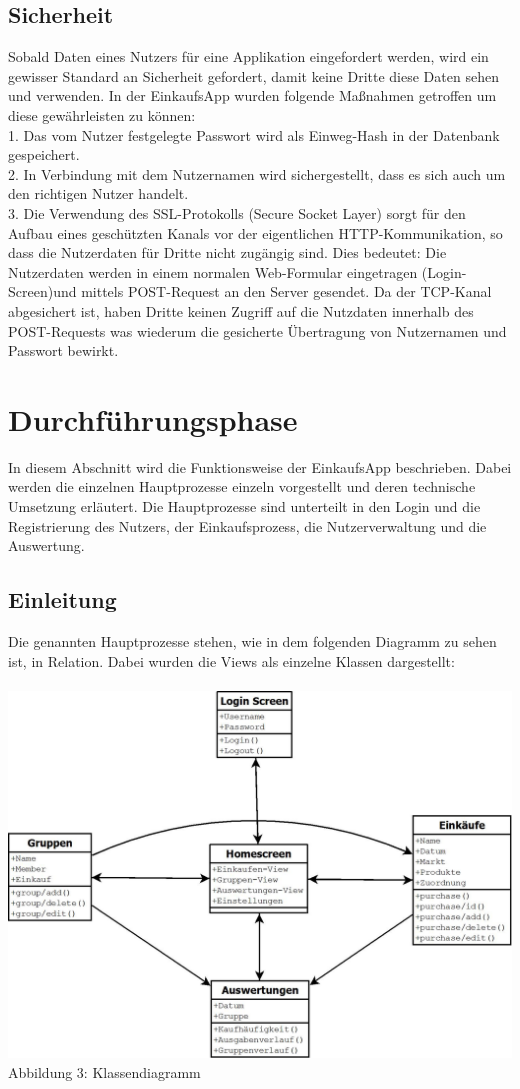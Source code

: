 \documentclass[12pt,a4paper]{article}
\begin{document}
\subsection{Sicherheit}
Sobald Daten eines Nutzers für eine Applikation eingefordert werden, wird ein gewisser Standard an Sicherheit gefordert, damit keine Dritte diese Daten sehen und verwenden.
In der EinkaufsApp wurden folgende Maßnahmen getroffen um diese gewährleisten zu können:
\\
1. Das vom Nutzer festgelegte Passwort wird als Einweg-Hash in der Datenbank gespeichert.
\\ 
2. In Verbindung mit dem Nutzernamen wird sichergestellt, dass es sich auch um den richtigen Nutzer handelt.
\\
 3. Die Verwendung des SSL-Protokolls (Secure Socket Layer) sorgt für  den Aufbau eines geschützten Kanals vor der eigentlichen HTTP-Kommunikation, so dass die Nutzerdaten für Dritte nicht zugängig sind. 
 Dies bedeutet: Die Nutzerdaten werden in einem normalen Web-Formular eingetragen (Login-Screen)und mittels POST-Request an den Server gesendet. 
 Da der TCP-Kanal abgesichert ist, haben Dritte keinen Zugriff auf die Nutzdaten innerhalb des POST-Requests was wiederum die gesicherte Übertragung von Nutzernamen und Passwort bewirkt.
\newpage
\section{Durchführungsphase}
In diesem Abschnitt wird die Funktionsweise der EinkaufsApp beschrieben. Dabei werden die einzelnen Hauptprozesse einzeln vorgestellt und deren technische Umsetzung erläutert. Die Hauptprozesse sind unterteilt in den Login und die Registrierung des Nutzers, der Einkaufsprozess, die Nutzerverwaltung und die Auswertung. 
\subsection*{Einleitung}
Die genannten Hauptprozesse stehen, wie in dem folgenden Diagramm zu sehen ist, in Relation. Dabei wurden die Views als einzelne Klassen dargestellt:
\\
\\
\includegraphics[scale=0.4, origin=l]{Klassen-UML.jpeg}
\\
\footnotesize Abbildung 3: Klassendiagramm
\normalsize
\end{document}
